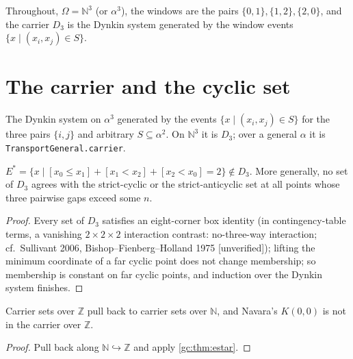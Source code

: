 Throughout, $\Omega=\mathbb N^3$ (or $\alpha^3$), the windows are the pairs
$\{0,1\},\{1,2\},\{2,0\}$, and the carrier $D_3$ is the Dynkin system generated
by the window events $\{x \mid (x_i,x_j)\in S\}$.

\section{The carrier and the cyclic set}

\begin{definition}
\label{gc:def:carrier}
\leanok
The Dynkin system on $\alpha^3$ generated by the events $\{x\mid (x_i,x_j)\in S\}$
for the three pairs $\{i,j\}$ and arbitrary $S\subseteq\alpha^2$. On $\mathbb N^3$
it is $D_3$; over a general $\alpha$ it is \texttt{TransportGeneral.carrier}.
\end{definition}

\begin{theorem}
\label{gc:thm:estar}
\leanok
{}
$E^*=\{x \mid [x_0\le x_1]+[x_1<x_2]+[x_2<x_0]=2\}\notin D_3$. More generally, no
set of $D_3$ agrees with the strict-cyclic or the strict-anticyclic set at all
points whose three pairwise gaps exceed some $n$.
\end{theorem}
\begin{proof}
\leanok
Every set of $D_3$ satisfies an eight-corner box identity (in contingency-table
terms, a vanishing $2\times2\times2$ interaction contrast: no-three-way
interaction; cf.\ Sullivant 2006, Bishop--Fienberg--Holland 1975
[unverified]); lifting the minimum
coordinate of a far cyclic point does not change membership; so membership is
constant on far cyclic points, and induction over the Dynkin system finishes.
\end{proof}

\begin{theorem}
\label{gc:thm:navara}
\leanok
{}
Carrier sets over $\mathbb Z$ pull back to carrier sets over $\mathbb N$, and
Navara's $K(0,0)$ is not in the carrier over $\mathbb Z$.
\end{theorem}
\begin{proof}
\leanok
Pull back along $\mathbb N\hookrightarrow\mathbb Z$ and apply \ref{gc:thm:estar}.
\end{proof}


